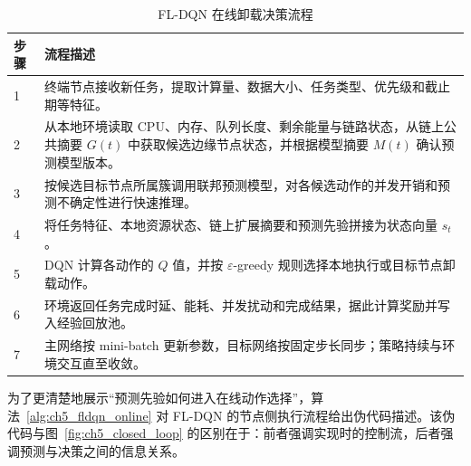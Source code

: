 \begin{table}[H]
    \centering
    \caption{FL-DQN 在线卸载决策流程}
    \label{tab:ch5_online_policy}
    \begin{tabular}{p{1.0cm}p{11.2cm}}
        \toprule
        步骤 & 流程描述                                                                              \\
        \midrule
        1  & 终端节点接收新任务，提取计算量、数据大小、任务类型、优先级和截止期等特征。                                             \\
        2  & 从本地环境读取 CPU、内存、队列长度、剩余能量与链路状态，从链上公共摘要 $G(t)$ 中获取候选边缘节点状态，并根据模型摘要 $M(t)$ 确认预测模型版本。 \\
        3  & 按候选目标节点所属簇调用联邦预测模型，对各候选动作的并发开销和预测不确定性进行快速推理。                                      \\
        4  & 将任务特征、本地资源状态、链上扩展摘要和预测先验拼接为状态向量 $s_t$。                                            \\
        5  & DQN 计算各动作的 $Q$ 值，并按 $\varepsilon$-greedy 规则选择本地执行或目标节点卸载动作。                       \\
        6  & 环境返回任务完成时延、能耗、并发扰动和完成结果，据此计算奖励并写入经验回放池。                                           \\
        7  & 主网络按 mini-batch 更新参数，目标网络按固定步长同步；策略持续与环境交互直至收敛。                                   \\
        \bottomrule
    \end{tabular}
\end{table}

为了更清楚地展示“预测先验如何进入在线动作选择”，算法~\ref{alg:ch5_fldqn_online} 对 FL-DQN 的节点侧执行流程给出伪代码描述。该伪代码与图~\ref{fig:ch5_closed_loop} 的区别在于：前者强调实现时的控制流，后者强调预测与决策之间的信息关系。

